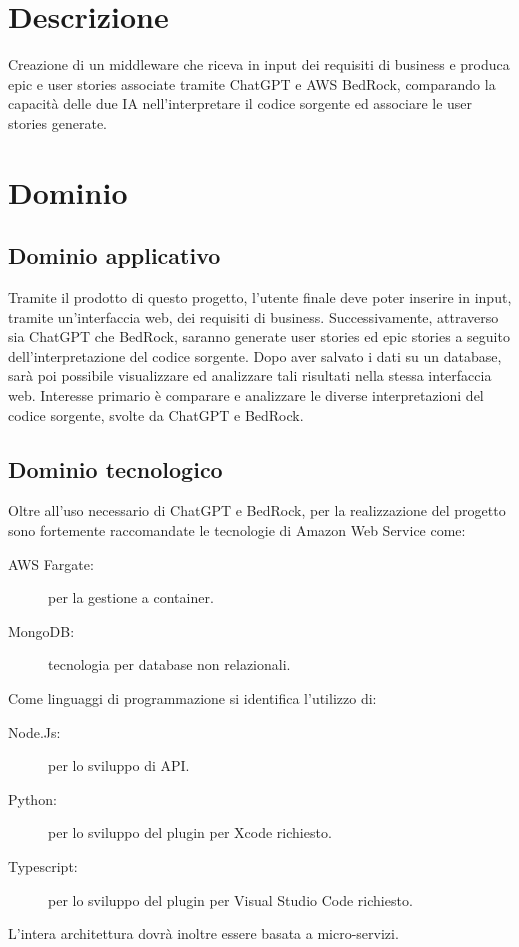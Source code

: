 \documentclass[12pt]{report}
\begin{document}
\section{Descrizione}
Creazione di un middleware che riceva in input dei requisiti di business e produca epic e user stories associate tramite ChatGPT e AWS BedRock, comparando la capacità delle due IA nell’interpretare il codice sorgente ed associare le user stories generate.

\section{Dominio}
\subsection{Dominio applicativo}
Tramite il prodotto di questo progetto, l'utente finale deve poter inserire in input, tramite un'interfaccia web, dei requisiti di business. Successivamente, attraverso sia ChatGPT che BedRock, saranno generate user stories ed epic stories a seguito dell'interpretazione del codice sorgente. Dopo aver salvato i dati su un database, sarà poi possibile visualizzare ed analizzare tali risultati nella stessa interfaccia web. Interesse primario è comparare e analizzare le diverse interpretazioni del codice sorgente, svolte da ChatGPT e BedRock.

\subsection{Dominio tecnologico}
Oltre all'uso necessario di ChatGPT e BedRock, per la realizzazione del progetto sono fortemente raccomandate le tecnologie di Amazon Web Service come:
\begin{description}
    \item[AWS Fargate:] per la gestione a container.
    \item[MongoDB:] tecnologia per database non relazionali.
\end{description}
Come linguaggi di programmazione si identifica l'utilizzo di:
\begin{description}
    \item[Node.Js:] per lo sviluppo di API.
    \item[Python:] per lo sviluppo del plugin per Xcode richiesto.
    \item[Typescript:] per lo sviluppo del plugin per Visual Studio Code richiesto.
\end{description}
L'intera architettura dovrà inoltre essere basata a micro-servizi.
\end{document}
